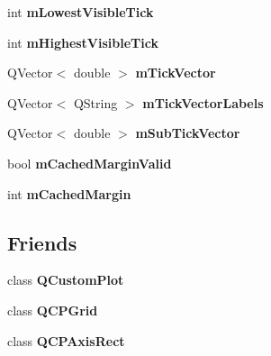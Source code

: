 \begin{DoxyCompactItemize}
\item 
\hypertarget{classQCPAxis_aebb24ba8734b7e054efc6e1ecc5414c7}{int {\bfseries m\-Lowest\-Visible\-Tick}}\label{classQCPAxis_aebb24ba8734b7e054efc6e1ecc5414c7}

\item 
\hypertarget{classQCPAxis_abb3b3ccce7e9779fef2be91ce1a46ef0}{int {\bfseries m\-Highest\-Visible\-Tick}}\label{classQCPAxis_abb3b3ccce7e9779fef2be91ce1a46ef0}

\item 
\hypertarget{classQCPAxis_aae0f9b9973b85be601200f00f5825087}{\-Q\-Vector$<$ double $>$ {\bfseries m\-Tick\-Vector}}\label{classQCPAxis_aae0f9b9973b85be601200f00f5825087}

\item 
\hypertarget{classQCPAxis_aeee4bd0fca3f587eafe33843d1cb4f82}{\-Q\-Vector$<$ \-Q\-String $>$ {\bfseries m\-Tick\-Vector\-Labels}}\label{classQCPAxis_aeee4bd0fca3f587eafe33843d1cb4f82}

\item 
\hypertarget{classQCPAxis_a28353081e0ff35c3fe5ced923a287faa}{\-Q\-Vector$<$ double $>$ {\bfseries m\-Sub\-Tick\-Vector}}\label{classQCPAxis_a28353081e0ff35c3fe5ced923a287faa}

\item 
\hypertarget{classQCPAxis_a2cde37b6e385f47e11322df4ac1b0e9b}{bool {\bfseries m\-Cached\-Margin\-Valid}}\label{classQCPAxis_a2cde37b6e385f47e11322df4ac1b0e9b}

\item 
\hypertarget{classQCPAxis_a48ace55cbd54f7241e7f1b06fd369b64}{int {\bfseries m\-Cached\-Margin}}\label{classQCPAxis_a48ace55cbd54f7241e7f1b06fd369b64}

\end{DoxyCompactItemize}
\subsection*{\-Friends}
\begin{DoxyCompactItemize}
\item 
\hypertarget{classQCPAxis_a1cdf9df76adcfae45261690aa0ca2198}{class {\bfseries \-Q\-Custom\-Plot}}\label{classQCPAxis_a1cdf9df76adcfae45261690aa0ca2198}

\item 
\hypertarget{classQCPAxis_a061e177f585549fc31f780852e2bd6fe}{class {\bfseries \-Q\-C\-P\-Grid}}\label{classQCPAxis_a061e177f585549fc31f780852e2bd6fe}

\item 
\hypertarget{classQCPAxis_acbf20ecb140f66c5fd1bc64ae0762990}{class {\bfseries \-Q\-C\-P\-Axis\-Rect}}\label{classQCPAxis_acbf20ecb140f66c5fd1bc64ae0762990}

\end{DoxyCompactItemize}


